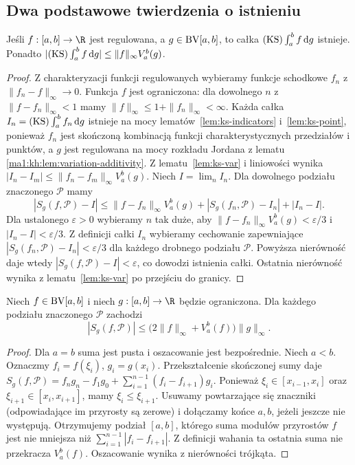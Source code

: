 \subsection*{Dwa podstawowe twierdzenia o istnieniu}
\begin{twierdzenie}
\label{tw:ks-reg-bv}
Jeśli $f:[a,b]\to\R$ jest regulowana, a $g\in\mathrm{BV}[a,b]$, to całka $(\mathrm{KS})\int_a^b f\,\mathrm dg$ istnieje. Ponadto
$|(\mathrm{KS})\int_a^b f\,\mathrm dg|\le\|f\|_\infty V_a^b(g)$.
\end{twierdzenie}
\begin{proof}
Z charakteryzacji funkcji regulowanych wybieramy funkcje schodkowe $f_n$ z $\|f_n-f\|_\infty\to0$. Funkcja $f$ jest ograniczona: dla dowolnego $n$ z $\|f-f_n\|_\infty<1$ mamy $\|f\|_\infty\le1+\|f_n\|_\infty<\infty$. Każda całka $I_n=(\mathrm{KS})\int_a^b f_n\,\mathrm dg$ istnieje na mocy lematów~\ref{lem:ks-indicators} i~\ref{lem:ks-point}, ponieważ $f_n$ jest skończoną kombinacją funkcji charakterystycznych przedziałów i punktów, a $g$ jest regulowana na mocy rozkładu Jordana z lematu \ref{ma1:kh:lem:variation-additivity}. Z lematu~\ref{lem:ks-var} i liniowości wynika $|I_n-I_m|\le\|f_n-f_m\|_\infty V_a^b(g)$. Niech $I=\lim_n I_n$. Dla dowolnego podziału znaczonego $\mathcal P$ mamy
\[
 |S_g(f,\mathcal P)-I|\le
 \|f-f_n\|_\infty V_a^b(g)+|S_g(f_n,\mathcal P)-I_n|+|I_n-I|.
\]
Dla ustalonego $\varepsilon>0$ wybieramy $n$ tak duże, aby $\|f-f_n\|_\infty V_a^b(g)<\varepsilon/3$ i $|I_n-I|<\varepsilon/3$. Z definicji całki $I_n$ wybieramy cechowanie zapewniające $|S_g(f_n,\mathcal P)-I_n|<\varepsilon/3$ dla każdego drobnego podziału $\mathcal P$. Powyższa nierówność daje wtedy $|S_g(f,\mathcal P)-I|<\varepsilon$, co dowodzi istnienia całki. Ostatnia nierówność wynika z lematu~\ref{lem:ks-var} po przejściu do granicy.
\end{proof}

\begin{lemat}
\label{lem:ks-summation}
Niech $f\in\mathrm{BV}[a,b]$ i niech $g:[a,b]\to\R$ będzie ograniczona. Dla każdego podziału znaczonego $\mathcal P$ zachodzi
\[
 |S_g(f,\mathcal P)|\le
 \bigl(2\|f\|_\infty+V_a^b(f)\bigr)\|g\|_\infty.
\]
\end{lemat}
\begin{proof}
Dla $a=b$ suma jest pusta i oszacowanie jest
bezpośrednie. Niech $a<b$. Oznaczmy $f_i=f(\xi_i)$,
$g_i=g(x_i)$. Przekształcenie skończonej sumy daje
$S_g(f,\mathcal P)=f_ng_n-f_1g_0+\sum_{i=1}^{n-1}(f_i-f_{i+1})g_i$. Ponieważ $\xi_i\in[x_{i-1},x_i]$ oraz
$\xi_{i+1}\in[x_i,x_{i+1}]$, mamy $\xi_i\le\xi_{i+1}$.
Usuwamy powtarzające się znaczniki (odpowiadające im
przyrosty są zerowe) i dołączamy końce $a,b$, jeżeli
jeszcze nie występują. Otrzymujemy podział $[a,b]$,
którego suma modułów przyrostów $f$ jest nie mniejsza
niż $\sum_{i=1}^{n-1}|f_i-f_{i+1}|$. Z definicji wahania
ta ostatnia suma nie przekracza $V_a^b(f)$. Oszacowanie wynika z nierówności trójkąta.
\end{proof}

